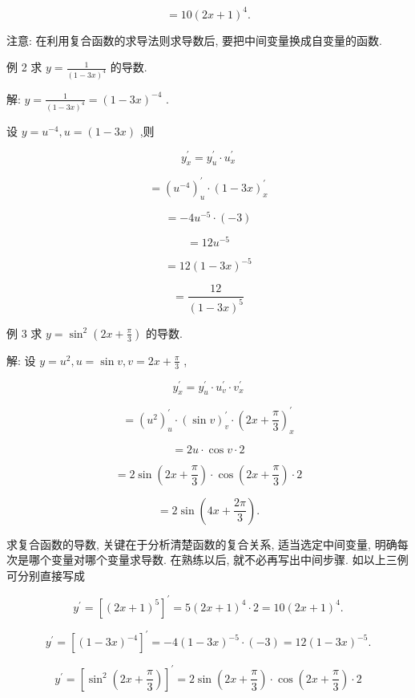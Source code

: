 \documentclass[lang=cn,newtx,12pt,scheme=chinese]{elegantbook}
\begin{document}
\[
= {10}{\left( 2x + 1\right) }^{4}\text{.}
\]

注意: 在利用复合函数的求导法则求导数后, 要把中间变量换成自变量的函数.

例 2 求 \(y = \frac{1}{{\left( 1 - 3x\right) }^{4}}\) 的导数.

解: \(y = \frac{1}{{\left( 1 - 3x\right) }^{4}} = {\left( 1 - 3x\right) }^{-4}\) .

设 \(y = {u}^{-4},u = \left( {1 - {3x}}\right)\) ,则

\[
{y}_{x}^{\prime } = {y}_{u}^{\prime } \cdot {u}_{x}^{\prime }
\]

\[
= {\left( {u}^{-4}\right) }_{u}^{\prime } \cdot {\left( 1 - 3x\right) }_{x}^{\prime }
\]

\[
= - 4{u}^{-5} \cdot \left( {-3}\right)
\]

\[
= {12}{u}^{-5}
\]

\[
= {12}{\left( 1 - 3x\right) }^{-5}
\]

\[
= \frac{12}{{\left( 1 - 3x\right) }^{5}}
\]

例 3 求 \(y = {\sin }^{2}\left( {{2x} + \frac{\pi }{3}}\right)\) 的导数.

解: 设 \(y = {u}^{2},u = \sin v,v = {2x} + \frac{\pi }{3}\) ,

\[
{y}_{x}^{\prime } = {y}_{u}^{\prime } \cdot {u}_{v}^{\prime } \cdot {v}_{x}^{\prime }
\]

\[
= {\left( {u}^{2}\right) }_{u}^{\prime } \cdot {\left( \sin v\right) }_{v}^{\prime } \cdot {\left( 2x + \frac{\pi }{3}\right) }_{x}^{\prime }
\]

\[
= {2u} \cdot \cos v \cdot 2
\]

\[
= 2\sin \left( {{2x} + \frac{\pi }{3}}\right) \cdot \cos \left( {{2x} + \frac{\pi }{3}}\right) \cdot 2
\]

\[
= 2\sin \left( {{4x} + \frac{2\pi }{3}}\right) \text{.}
\]

求复合函数的导数, 关键在于分析清楚函数的复合关系, 适当选定中间变量, 明确每次是哪个变量对哪个变量求导数. 在熟练以后, 就不必再写出中间步骤. 如以上三例可分别直接写成

\[
{y}^{\prime } = {\left\lbrack {\left( 2x + 1\right) }^{5}\right\rbrack }^{\prime } = 5{\left( 2x + 1\right) }^{4} \cdot 2 = {10}{\left( 2x + 1\right) }^{4}.
\]

\[
{y}^{\prime } = {\left\lbrack {\left( 1 - 3x\right) }^{-4}\right\rbrack }^{\prime } = - 4{\left( 1 - 3x\right) }^{-5} \cdot \left( {-3}\right) = {12}{\left( 1 - 3x\right) }^{-5}.
\]

\[
{y}^{\prime } = {\left\lbrack {\sin }^{2}\left( 2x + \frac{\pi }{3}\right) \right\rbrack }^{\prime } = 2\sin \left( {{2x} + \frac{\pi }{3}}\right) \cdot \cos \left( {{2x} + \frac{\pi }{3}}\right) \cdot 2
\]
\end{document}
